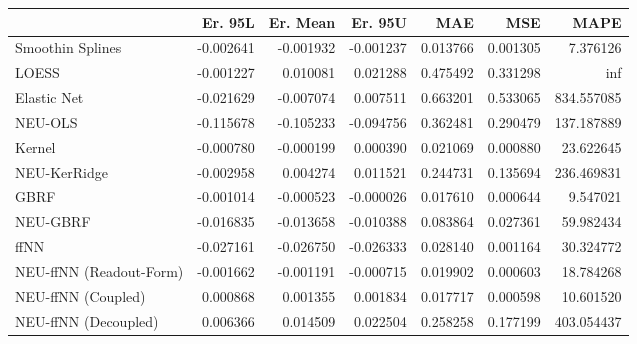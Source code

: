 \begin{tabular}{lrrrrrr}
\toprule
{} &   Er. 95L &  Er. Mean &   Er. 95U &       MAE &       MSE &        MAPE \\
\midrule
Smoothin Splines        & -0.002641 & -0.001932 & -0.001237 &  0.013766 &  0.001305 &    7.376126 \\
LOESS                   & -0.001227 &  0.010081 &  0.021288 &  0.475492 &  0.331298 &         inf \\
Elastic Net             & -0.021629 & -0.007074 &  0.007511 &  0.663201 &  0.533065 &  834.557085 \\
NEU-OLS                 & -0.115678 & -0.105233 & -0.094756 &  0.362481 &  0.290479 &  137.187889 \\
Kernel                  & -0.000780 & -0.000199 &  0.000390 &  0.021069 &  0.000880 &   23.622645 \\
NEU-KerRidge            & -0.002958 &  0.004274 &  0.011521 &  0.244731 &  0.135694 &  236.469831 \\
GBRF                    & -0.001014 & -0.000523 & -0.000026 &  0.017610 &  0.000644 &    9.547021 \\
NEU-GBRF                & -0.016835 & -0.013658 & -0.010388 &  0.083864 &  0.027361 &   59.982434 \\
ffNN                    & -0.027161 & -0.026750 & -0.026333 &  0.028140 &  0.001164 &   30.324772 \\
NEU-ffNN (Readout-Form) & -0.001662 & -0.001191 & -0.000715 &  0.019902 &  0.000603 &   18.784268 \\
NEU-ffNN (Coupled)      &  0.000868 &  0.001355 &  0.001834 &  0.017717 &  0.000598 &   10.601520 \\
NEU-ffNN (Decoupled)    &  0.006366 &  0.014509 &  0.022504 &  0.258258 &  0.177199 &  403.054437 \\
\bottomrule
\end{tabular}
